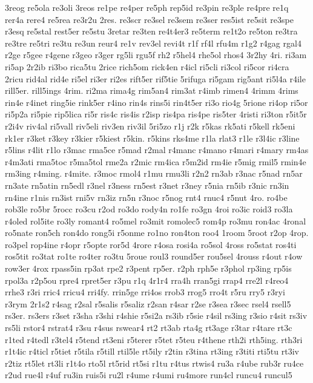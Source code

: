 {3reog
re5ola
re3oli
3reos
re1pe
re4per
re5ph
rep5id
re3pin
re3ple
re4pre
re1q
rer4a
rere4
re5rea
re3r2u
2res.
re3scr
re3sel
re3sem
re3ser
res5ist
re5sit
re3spe
r3esq
re5stal
rest5er
re5stu
3retar
re3ten
re4t4er3
re5term
re1t2o
re5ton
re3tra
re3tre
re5tri
re3tu
re3un
reur4
re1v
rev3el
revi4t
r1f
rf4l
rfu4m
r1g2
r4gag
rgal4
r2ge
r5gee
r4gene
r3geo
r3ger
rg5li
rgu5f
rh2
r5hel4
rhe5ol
rhos4
3r2hy
4ri.
ri3am
ri5ap
2r2ib
ri3bo
rica5tu
2rice
rich5om
rick4en
r4icl
ri5cli
ri3col
ri5cor
ri4cra
2ricu
rid4al
rid4e
ri5el
ri3er
ri2es
rift5er
rif5tie
5rifuga
ri5gam
rig5ant
ri5l4a
r4ile
rill5er.
rill5ings
4rim.
ri2ma
rima4g
rim5an4
rim3at
r4imb
rimen4
4rimm
4rims
rin4e
r4inet
ring5ie
rink5er
r4ino
rin4s
rins5i
rin4t5er
ri3o
rio4g
5rione
ri4op
ri5or
ri5p2a
ri5pie
rip5lica
ri5r
ris4c
ris4is
r2isp
ris4pa
ris4pe
ris5ter
4risti
ri3ton
r5it5r
r2i4v
riv4al
ri5vall
riv5eli
riv3en
riv3il
5ri5zo
r1j
r2k
r5kas
rk5ati
r5kell
rk5eni
rk1er
r3ket
r3key
r3kier
r5kiest
r5kin.
r5kins
rks4me
r1la
rlat3
r1le
r3l4ic
r3line
r5lins
r4lit
r1lo
r3mac
rma5ce
r5mad
r2mal
r4manc
r4mano
r4mari
r4mary
rm4as
r4m3ati
rma5toc
r5ma5tol
rme2a
r2mic
rm4ica
r5m2id
rm4ie
r5mig
rmil5
rmin4e
rm3ing
r4ming.
r4mite.
r3moc
rmol4
r1mu
rmu3li
r2n2
rn3ab
r3nac
r5nad
rn5ar
rn3ate
rn5atin
rn5edl
r3nel
r3ness
rn5est
r3net
r3ney
r5nia
rn5ib
r3nic
rn3in
rn4ine
r1nis
rn3ist
rni5v
rn3iz
rn5n
r3noc
r5nog
rnt4
rnuc4
r5nut
4ro.
ro4be
rob3le
ro5br
5rocc
ro3cu
r2od
ro3do
rody4n
ro1fe
ro3gn
4roi
ro3ic
roid3
ro3la
r4oled
rol5ite
ro3ly
romant4
ro5mel
ro3mit
romolec5
rom4p
ro3mu
ron4ac
4ronal
ro5nate
ron5ch
ron4do
rong5i
r5onme
ro1no
ron4ton
roo4
1room
5root
r2op
4rop.
ro3pel
rop4ine
r4opr
r5opte
ror5d
4rore
r4osa
rosi4a
ro5sol
4ross
ro5stat
ros4ti
ros5tit
ro3tat
ro1te
ro4ter
ro3tu
5roue
roul3
round5er
rou5sel
4rouss
r4out
r4ow
row3er
4rox
rpass5in
rp3at
rpe2
r3pent
rp5er.
r2ph
rph5e
r3phol
rp3ing
rp5is
rpol3a
r2p5ou
rpre4
rpret5er
r3pu
r1q
4r1r4
rra4h
rran5gi
rrap4
rre2l
r4reo4
rrhe3
r3ri
rric4
rricu4
rri4fy.
rrin5ge
rri4os
rrob3
rrog5
rro4t
r5ru
rry5
r3ryi
r3rym
2r1s2
r4sag
r2sal
r5salis
r5saliz
r2san
r4sar
r2se
r3sea
r3sec
rsel4
rsell5
rs3er.
rs3ers
r3set
r3sha
r3shi
r4shie
r5si2a
rs3ib
r5sie
r4sil
rs3ing
r3sio
r4sit
rs3iv
rs5li
rstor4
rstrat4
r3su
r4sus
rswear4
rt2
rt3ab
rta4g
rt3age
r3tar
r4tare
rt3c
r1ted
r4tedl
r3tel4
r5tend
rt3eni
r5terer
r5tet
r5teu
r4thene
rth2i
rth5ing.
rth3ri
r1t4ic
r4ticl
r5tiet
r5tila
r5till
rtil5le
rt5ily
r2tin
r3tina
rt3ing
r3titi
rti5tu
rt3iv
r2tiz
rt5let
rt3li
r1t4o
rto5l
rt5rid
rt5si
r1tu
r4tus
rtwis4
ru3a
r4ube
rub3r
ru4ce
r2ud
rue4l
r4uf
ru3in
ruis5i
ru2l
r4ume
r4umi
ru4more
run4cl
runcu4
runcul5
}
